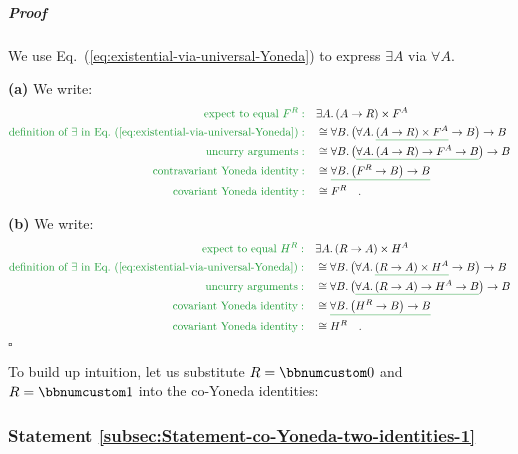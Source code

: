 \subparagraph{Proof}

We use Eq.~(\ref{eq:existential-via-universal-Yoneda}) to express
$\exists A$ via $\forall A$. 

\textbf{(a)} We write:
\begin{align*}
{\color{greenunder}\text{expect to equal }F^{R}:}\quad & \exists A.\,(A\rightarrow R)\times F^{A}\\
{\color{greenunder}\text{definition of }\exists\text{ in Eq.~}(\ref{eq:existential-via-universal-Yoneda}):}\quad & \cong\forall B.\,\big(\forall A.\,\gunderline{(A\rightarrow R)\times F^{A}}\rightarrow B\big)\rightarrow B\\
{\color{greenunder}\text{uncurry arguments}:}\quad & \cong\forall B.\,\big(\gunderline{\forall A.\,(A\rightarrow R)\rightarrow F^{A}\rightarrow B}\big)\rightarrow B\\
{\color{greenunder}\text{contravariant Yoneda identity}:}\quad & \cong\gunderline{\forall B.\,\big(F^{R}\rightarrow B\big)\rightarrow B}\\
{\color{greenunder}\text{covariant Yoneda identity}:}\quad & \cong F^{R}\quad.
\end{align*}

\textbf{(b)} We write:
\begin{align*}
{\color{greenunder}\text{expect to equal }H^{R}:}\quad & \exists A.\,(R\rightarrow A)\times H^{A}\\
{\color{greenunder}\text{definition of }\exists\text{ in Eq.~}(\ref{eq:existential-via-universal-Yoneda}):}\quad & \cong\forall B.\,\big(\forall A.\,\gunderline{(R\rightarrow A)\times H^{A}}\rightarrow B\big)\rightarrow B\\
{\color{greenunder}\text{uncurry arguments}:}\quad & \cong\forall B.\,\big(\gunderline{\forall A.\,(R\rightarrow A)\rightarrow H^{A}\rightarrow B}\big)\rightarrow B\\
{\color{greenunder}\text{covariant Yoneda identity}:}\quad & \cong\gunderline{\forall B.\,\big(H^{R}\rightarrow B\big)\rightarrow B}\\
{\color{greenunder}\text{covariant Yoneda identity}:}\quad & \cong H^{R}\quad.
\end{align*}
$\square$

To build up intuition, let us substitute $R=\bbnum 0$ and $R=\bbnum 1$
into the co-Yoneda identities:

\subsubsection{Statement \label{subsec:Statement-co-Yoneda-two-identities-1}\ref{subsec:Statement-co-Yoneda-two-identities-1}}

